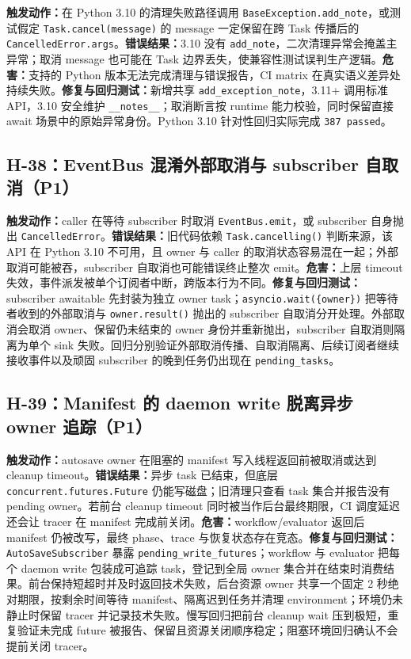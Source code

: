 \documentclass[11pt,a4paper,fontset=fandol]{ctexart}
\newcommand{\code}[1]{\texttt{#1}}
\begin{document}
\textbf{触发动作：}在 Python 3.10 的清理失败路径调用 \code{BaseException.add\_note}，或测试假定 \code{Task.cancel(message)} 的 message 一定保留在跨 Task 传播后的 \code{CancelledError.args}。\textbf{错误结果：}3.10 没有 \code{add\_note}，二次清理异常会掩盖主异常；取消 message 也可能在 Task 边界丢失，使兼容性测试误判生产逻辑。\textbf{危害：}支持的 Python 版本无法完成清理与错误报告，CI matrix 在真实语义差异处持续失败。\textbf{修复与回归测试：}新增共享 \code{add\_exception\_note}，3.11+ 调用标准 API，3.10 安全维护 \code{\_\_notes\_\_}；取消断言按 runtime 能力校验，同时保留直接 await 场景中的原始异常身份。Python 3.10 针对性回归实际完成 \code{387 passed}。

\subsection{H-38：EventBus 混淆外部取消与 subscriber 自取消（P1）}

\textbf{触发动作：}caller 在等待 subscriber 时取消 \code{EventBus.emit}，或 subscriber 自身抛出 \code{CancelledError}。\textbf{错误结果：}旧代码依赖 \code{Task.cancelling()} 判断来源，该 API 在 Python 3.10 不可用，且 owner 与 caller 的取消状态容易混在一起；外部取消可能被吞，subscriber 自取消也可能错误终止整次 emit。\textbf{危害：}上层 timeout 失效，事件派发被单个订阅者中断，跨版本行为不同。\textbf{修复与回归测试：}subscriber awaitable 先封装为独立 owner task；\code{asyncio.wait(\{owner\})} 把等待者收到的外部取消与 \code{owner.result()} 抛出的 subscriber 自取消分开处理。外部取消会取消 owner、保留仍未结束的 owner 身份并重新抛出，subscriber 自取消则隔离为单个 sink 失败。回归分别验证外部取消传播、自取消隔离、后续订阅者继续接收事件以及顽固 subscriber 的晚到任务仍出现在 \code{pending\_tasks}。

\subsection{H-39：Manifest 的 daemon write 脱离异步 owner 追踪（P1）}

\textbf{触发动作：}autosave owner 在阻塞的 manifest 写入线程返回前被取消或达到 cleanup timeout。\textbf{错误结果：}异步 task 已结束，但底层 \code{concurrent.futures.Future} 仍能写磁盘；旧清理只查看 task 集合并报告没有 pending owner。若前台 cleanup timeout 同时被当作后台最终期限，CI 调度延迟还会让 tracer 在 manifest 完成前关闭。\textbf{危害：}workflow/evaluator 返回后 manifest 仍被改写，最终 phase、trace 与恢复状态存在竞态。\textbf{修复与回归测试：}\code{AutoSaveSubscriber} 暴露 \code{pending\_write\_futures}；workflow 与 evaluator 把每个 daemon write 包装成可追踪 task，登记到全局 owner 集合并在结束时消费结果。前台保持短超时并及时返回技术失败，后台资源 owner 共享一个固定 2 秒绝对期限，按剩余时间等待 manifest、隔离迟到任务并清理 environment；环境仍未静止时保留 tracer 并记录技术失败。慢写回归把前台 cleanup wait 压到极短，重复验证未完成 future 被报告、保留且资源关闭顺序稳定；阻塞环境回归确认不会提前关闭 tracer。
\end{document}

